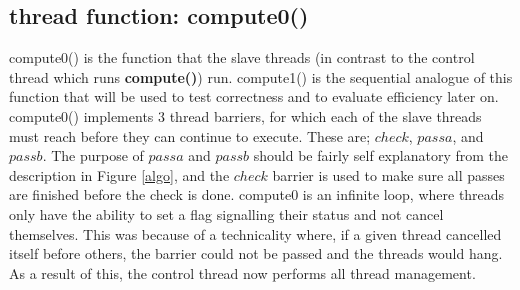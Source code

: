 \documentclass{article}
\begin{document}
\subsection{thread function: compute0()}
compute0() is the function that the slave threads (in contrast to the control thread which runs \textbf{compute()}) run. compute1() is the sequential analogue of this function that will be used to test correctness and to evaluate efficiency later on. 
compute0() implements 3 thread barriers, for which each of the slave threads must reach before they can continue to execute. These are; $check$, $passa$, and $passb$. The purpose of $passa$ and $passb$ should be fairly self explanatory from the description in Figure \ref{algo}, and the $check$ barrier is used to make sure all passes are finished before the check is done. compute0 is an infinite loop, where threads only have the ability to set a flag signalling their status and not cancel themselves. This was because of a technicality where, if a given thread cancelled itself before others, the barrier could not be passed and the threads would hang. As a result of this, the control thread now performs all thread management.
\end{document}
